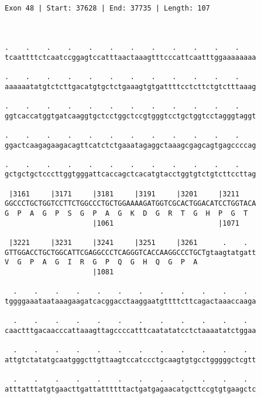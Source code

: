 \documentclass{article}
\begin{document}
\begin{Verbatim}
                                                       
 
Exon 48 | Start: 37628 | End: 37735 | Length: 107



.    .    .    .    .    .    .    .    .    .    .    .    
tcaattttctcaatccggagtccatttaactaaagtttcccattcaatttggaaaaaaaa
                                                            
.    .    .    .    .    .    .    .    .    .    .    .    
aaaaaatatgtctcttgacatgtgctctgaaagtgtgattttcctcttctgtctttaaag
                                                            
.    .    .    .    .    .    .    .    .    .    .    .    
ggtcaccatggtgatcaaggtgctcctggctccgtgggtcctgctggtcctagggtaggt
                                                            
.    .    .    .    .    .    .    .    .    .    .    .    
ggactcaagagaagacagttcatctctgaaatagaggctaaagcgagcagtgagccccag
                                                            
.    .    .    .    .    .    .    .    .    .    .    .    
gctgctgctcccttggtgggattcaccagctcacatgtacctggtgtctgtcttccttag
                                                            
 |3161     |3171     |3181     |3191     |3201     |3211    
GGCCCTGCTGGTCCTTCTGGCCCTGCTGGAAAAGATGGTCGCACTGGACATCCTGGTACA
G  P  A  G  P  S  G  P  A  G  K  D  G  R  T  G  H  P  G  T  
                     |1061                         |1071    
  
 |3221     |3231     |3241     |3251     |3261      .    .  
GTTGGACCTGCTGGCATTCGAGGCCCTCAGGGTCACCAAGGCCCTGCTgtaagtatgatt
V  G  P  A  G  I  R  G  P  Q  G  H  Q  G  P  A              
                     |1081                                  
  
  .    .    .    .    .    .    .    .    .    .    .    .  
tggggaaataataaagaagatcacggacctaaggaatgttttcttcagactaaaccaaga
                                                            
  .    .    .    .    .    .    .    .    .    .    .    .  
caactttgacaacccattaaagttagccccatttcaatatatcctctaaaatatctggaa
                                                            
  .    .    .    .    .    .    .    .    .    .    .    .  
attgtctatatgcaatgggcttgttaagtccatccctgcaagtgtgcctgggggctcgtt
                                                            
  .    .    .    .    .    .    .    .    .    .    .    .  
atttatttatgtgaacttgattattttttactgatgagaacatgcttccgtgtgaagctc
                                                            

\end{Verbatim}
\end{document}
